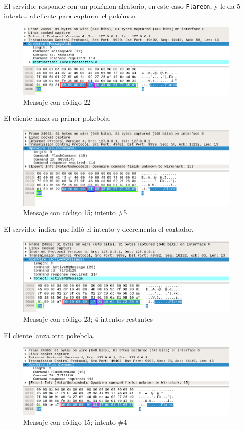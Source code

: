 \documentclass[12pt]{article}
\begin{document}
El servidor responde con un pokémon aleatorio, en este caso \texttt{Flareon}, y le da 5 intentos al cliente para capturar el pokémon.
\begin{figure}[H]
  \centering
  \includegraphics[width=\textwidth]{16}
  \caption{Mensaje con código 22}
\end{figure}

El cliente lanza su primer pokebola.
\begin{figure}[H]
  \centering
  \includegraphics[width=\textwidth]{17}
  \caption{Mensaje con código 15; intento $\#$5}
\end{figure}

El servidor indica que falló el intento y decrementa el contador.
\begin{figure}[H]
  \centering
  \includegraphics[width=\textwidth]{18}
  \caption{Mensaje con código 23; 4 intentos restantes}
\end{figure}

El cliente lanza otra pokebola.
\begin{figure}[H]
  \centering
  \includegraphics[width=\textwidth]{19}
  \caption{Mensaje con código 15; intento $\#$4}
\end{figure}
\end{document}

